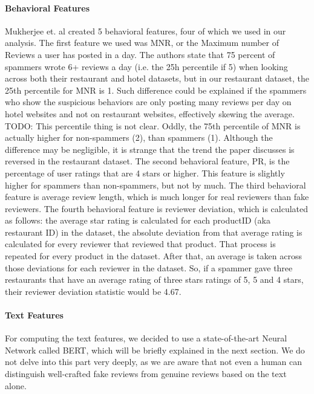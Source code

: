 \documentclass[man, floatsintext, 10pt]{apa6}
\begin{document}
\paragraph{Behavioral Features} Mukherjee et. al created 5 behavioral features, four of which we used in our analysis. The first feature we used was MNR, or the Maximum number of Reviews a user has posted in a day. The authors state that 75 percent of spammers wrote 6+ reviews a day (i.e. the 25h percentile if 5)  when looking across both their restaurant and hotel datasets, but in our restaurant dataset, the 25th percentile for MNR is 1. Such difference could be explained if the spammers who show the suspicious behaviors are only posting many reviews per day on hotel websites and not on restaurant websites, effectively skewing the average. TODO: This percentile thing is not clear. Oddly, the 75th percentile of MNR is actually higher for non-spammers (2), than spammers (1). Although the difference may be negligible, it is strange that the trend the paper discusses is reversed in the restaurant dataset. The second behavioral feature, PR, is the percentage of user ratings that are 4 stars or higher. This feature is slightly higher for spammers than non-spammers, but not by much. The third behavioral feature is average review length, which is much longer for real reviewers than fake reviewers. The fourth behavioral feature is reviewer deviation, which is calculated as follows: the average star rating is calculated for each productID (aka restaurant ID) in the dataset, the absolute deviation from that average rating is calculated for every reviewer that reviewed that product. That process is repeated for every product in the dataset. After that, an average is taken across those deviations for each reviewer in the dataset. So, if a spammer gave three restaurants that have an average rating of three stars ratings of 5, 5 and 4 stars, their reviewer deviation statistic would be 4.67.

 \vspace{2mm}
 
\paragraph{Text Features} For computing the text features, we decided to use a state-of-the-art Neural Network called BERT, which will be briefly explained in the next section. We do not delve into this part very deeply, as we are aware that not even a human can distinguish well-crafted fake reviews from genuine reviews based on the text alone.
\end{document}
